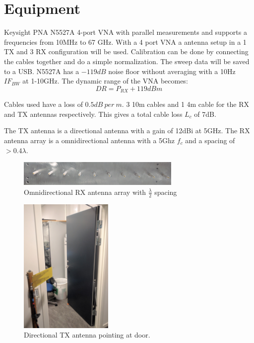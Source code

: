 \section{Equipment}
Keysight PNA N5527A 4-port VNA with parallel measurements and supports a frequencies from 10MHz to 67 GHz. With a 4 port VNA a antenna setup in a 1 TX and 3 RX configuration will be used. Calibration can be done by connecting the cables together and do a simple normalization. The sweep data will be saved to a USB.
N5527A has a $-119dB$ noise floor without averaging with a 10Hz $IF_{BW}$ at 1-10GHz. The dynamic range of the VNA becomes:
\begin{equation}
DR = P_{RX}+119dBm 
\label{NFvna}
\end{equation}




Cables used have a loss of $0.5dB  \ per \ m$. 3 10m cables and 1 4m cable for the RX and TX antennas respectively. This gives a total cable loss $L_c$ of 7dB.

The TX antenna is a directional antenna with a gain of 12dBi at 5GHz.
The RX antenna array is a omnidirectional antenna with a 5Ghz $f_c$ and a spacing of $>0.4 \lambda$.
\begin{figure}[H]
\centering
\includegraphics[width=0.7\textwidth]{pictures/Measurement/antenna_array.jpg}
    \caption{Omnidirectional RX antenna array with $\frac{\lambda}{2}$ spacing}
\end{figure}

\begin{figure}[H]
\centering
\includegraphics[width=0.4\textwidth]{pictures/Measurement/antenna_door.jpg}
\caption{Directional TX antenna pointing at door.}
\end{figure}


